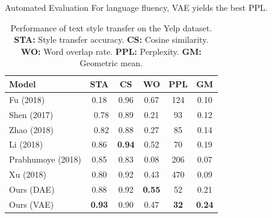 \documentclass[final]{beamer}
\newlength{\onecolwid}
\newlength{\twocolwid}
\begin{document}
\begin{frame}[t]
\begin{columns}[t]
\begin{column}{\twocolwid}
\begin{columns}[t,totalwidth=\twocolwid]
\begin{column}{\onecolwid}
\begin{block}{Automated Evaluation}
                        For language fluency, VAE yields the best PPL.

                        \begin{table}[ht]
                            \centering
                            \begin{tabular}{l c c c c c}
                                \textbf{Model}    & \textbf{STA}     & \textbf{CS}       & \textbf{WO}       & \textbf{PPL}     & \textbf{GM}       \\
                                \hline
                                Fu (2018)         & \color{gray}0.18 & \color{gray} 0.96 & \color{gray} 0.67 & \color{gray} 124 & \color{gray} 0.10 \\
                                Shen (2017)       & \ 0.78           & 0.89              & 0.21              & 93               & 0.12              \\
                                Zhao (2018)       & \ 0.82           & 0.88              & 0.27              & 85               & 0.14              \\
                                Li (2018)         & 0.86             & \textbf{0.94}     & 0.52              & 70               & 0.19              \\
                                Prabhumoye (2018) & 0.85             & 0.83              & 0.08              & 206              & 0.07              \\
                                Xu (2018)         & 0.80             & 0.92              & 0.43              & 470              & 0.09              \\
                                Ours (DAE)        & 0.88             & 0.92              & \textbf{0.55}     & 52               & 0.21              \\
                                Ours (VAE)        & \textbf{0.93}    & 0.90              & 0.47              & \textbf{32}      & \textbf{0.24}     \\
                            \end{tabular}
                            \caption{Performance of text style transfer on the Yelp dataset. \textbf{STA:} Style transfer accuracy. \textbf{CS:} Cosine similarity. \textbf{WO:} Word overlap rate. \textbf{PPL:} Perplexity. \textbf{GM:} Geometric mean.}
                            \label{tab:comparison-previous}
                        \end{table}



\end{block}
\end{column}
\end{columns}
\end{column}
\end{columns}
\end{frame}
\end{document}
